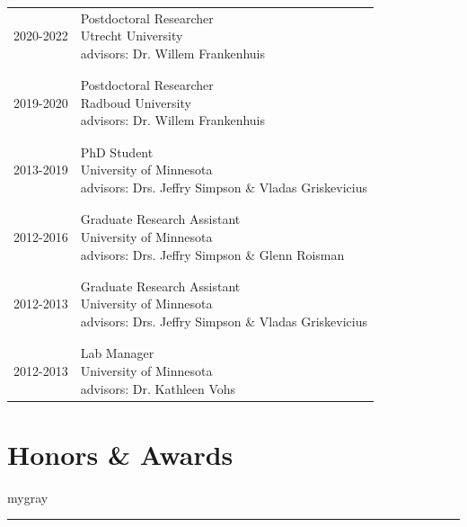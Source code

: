 \documentclass[
]{article}
\begin{document}
\begin{longtable}{p{2.25cm}p{5.5in}}
2020-2022 & \parbox[t]{5.0in}{Postdoctoral Researcher \newline Utrecht University \newline advisors: Dr. Willem Frankenhuis} \\\\& \\
2019-2020 & \parbox[t]{5.0in}{Postdoctoral Researcher \newline Radboud University \newline advisors: Dr. Willem Frankenhuis} \\\\& \\
2013-2019 & \parbox[t]{5.0in}{PhD Student \newline University of Minnesota \newline advisors: Drs. Jeffry Simpson \& Vladas Griskevicius} \\\\& \\
2012-2016 & \parbox[t]{5.0in}{Graduate Research Assistant \newline University of Minnesota \newline advisors: Drs. Jeffry Simpson \& Glenn Roisman} \\\\& \\
2012-2013 & \parbox[t]{5.0in}{Graduate Research Assistant \newline University of Minnesota \newline advisors: Drs. Jeffry Simpson \& Vladas Griskevicius} \\\\& \\
2012-2013 & \parbox[t]{5.0in}{Lab Manager \newline University of Minnesota \newline advisors: Dr. Kathleen Vohs} \\
\end{longtable}

\vspace{1ex}

\hypertarget{honors-awards}{%
\section{\texorpdfstring{\textbf{Honors \&
Awards}}{Honors \& Awards}}\label{honors-awards}}

\vspace{1ex}
\begin{color}{mygray}\hrule\end{color}
\vspace{1ex}
\end{document}
